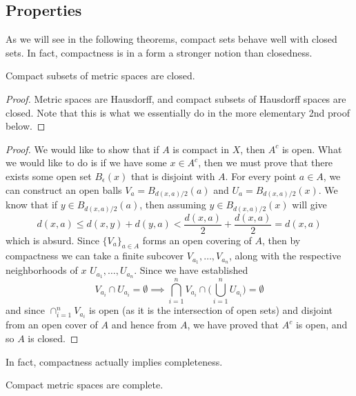 \subsection{Properties} 

  As we will see in the following theorems, compact sets behave well with closed sets. In fact, compactness is in a form a stronger notion than closedness. 

  \begin{theorem}
    Compact subsets of metric spaces are closed. 
  \end{theorem}
  \begin{proof}
    Metric spaces are Hausdorff, and compact subsets of Hausdorff spaces are closed. Note that this is what we essentially do in the more elementary 2nd proof below. 
  \end{proof}
  \begin{proof}
    We would like to show that if $A$ is compact in $X$, then $A^c$ is open. What we would like to do is if we have some $x \in A^c$, then we must prove that there exists some open set $B_\epsilon (x)$ that is disjoint with $A$. For every point $a \in A$, we can construct an open balls $V_a = B_{d(x, a)/2} (a)$ and $U_a = B_{d(x, a)/2} (x)$. We know that if $y \in B_{d(x, a)/2}(a)$, then assuming $y \in B_{d(x, a)/2} (x)$ will give
    \begin{equation}
      d(x, a) \leq d(x, y) + d(y, a) < \frac{d(x, a)}{2} + \frac{d(x, a)}{2} = d(x, a)
    \end{equation}
    which is absurd. 
    Since $\{V_a\}_{a \in A}$ forms an open covering of $A$, then by compactness we can take a finite subcover $V_{a_1}, \ldots, V_{a_n}$, along with the respective neighborhoods of $x$ $U_{a_1}, \ldots, U_{a_n}$. Since we have established 
    \begin{equation}
      V_{a_i} \cap U_{a_i} = \emptyset \implies \bigcap_{i=1}^n V_{a_i} \cap \bigg( \bigcup_{i=1}^n U_{a_i} \bigg) = \emptyset
    \end{equation}
    and since $\cap_{i=1}^n V_{a_i}$ is open (as it is the intersection of open sets) and disjoint from an open cover of $A$ and hence from $A$, we have proved that $A^c$ is open, and so $A$ is closed. 
  \end{proof}

  In fact, compactness actually implies completeness. 

  \begin{theorem}
    Compact metric spaces are complete. 
  \end{theorem} 


